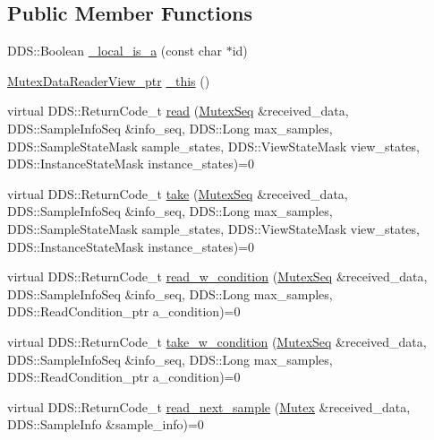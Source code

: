 \subsection*{Public Member Functions}
\begin{DoxyCompactItemize}
\item 
DDS::Boolean \hyperlink{classKnowledge_1_1MutexDataReaderView_ae761ad249559f3b3c39c52ffc9d2547d}{\_\-local\_\-is\_\-a} (const char $\ast$id)
\item 
\hyperlink{classKnowledge_1_1MutexDataReaderView}{MutexDataReaderView\_\-ptr} \hyperlink{classKnowledge_1_1MutexDataReaderView_a7962b5777640ce1743eb23b1d8d2fc5c}{\_\-this} ()
\item 
virtual DDS::ReturnCode\_\-t \hyperlink{classKnowledge_1_1MutexDataReaderView_acc93435f3bf847b12dfbaf7d660a312e}{read} (\hyperlink{namespaceKnowledge_a3165529aa87299c6a92754fbd7eeeff4}{MutexSeq} \&received\_\-data, DDS::SampleInfoSeq \&info\_\-seq, DDS::Long max\_\-samples, DDS::SampleStateMask sample\_\-states, DDS::ViewStateMask view\_\-states, DDS::InstanceStateMask instance\_\-states)=0
\item 
virtual DDS::ReturnCode\_\-t \hyperlink{classKnowledge_1_1MutexDataReaderView_adf68b09d49094cf08f828a2d1d66c960}{take} (\hyperlink{namespaceKnowledge_a3165529aa87299c6a92754fbd7eeeff4}{MutexSeq} \&received\_\-data, DDS::SampleInfoSeq \&info\_\-seq, DDS::Long max\_\-samples, DDS::SampleStateMask sample\_\-states, DDS::ViewStateMask view\_\-states, DDS::InstanceStateMask instance\_\-states)=0
\item 
virtual DDS::ReturnCode\_\-t \hyperlink{classKnowledge_1_1MutexDataReaderView_aa4c7e4993accd8e7ce7bf97a4a5fc415}{read\_\-w\_\-condition} (\hyperlink{namespaceKnowledge_a3165529aa87299c6a92754fbd7eeeff4}{MutexSeq} \&received\_\-data, DDS::SampleInfoSeq \&info\_\-seq, DDS::Long max\_\-samples, DDS::ReadCondition\_\-ptr a\_\-condition)=0
\item 
virtual DDS::ReturnCode\_\-t \hyperlink{classKnowledge_1_1MutexDataReaderView_a48705feff73fc74c7c798735038e2aaa}{take\_\-w\_\-condition} (\hyperlink{namespaceKnowledge_a3165529aa87299c6a92754fbd7eeeff4}{MutexSeq} \&received\_\-data, DDS::SampleInfoSeq \&info\_\-seq, DDS::Long max\_\-samples, DDS::ReadCondition\_\-ptr a\_\-condition)=0
\item 
virtual DDS::ReturnCode\_\-t \hyperlink{classKnowledge_1_1MutexDataReaderView_a9676c07ee0f092da46f349944db3b9c6}{read\_\-next\_\-sample} (\hyperlink{structKnowledge_1_1Mutex}{Mutex} \&received\_\-data, DDS::SampleInfo \&sample\_\-info)=0

\end{DoxyCompactItemize}
